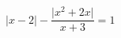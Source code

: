 \begin{ex}[type=equation]
	\begin{condition}
		$\big|x - 2\big| - \dfrac{\big|x^2 + 2x\big|}{x + 3}= 1$
	\end{condition}
\end{ex}